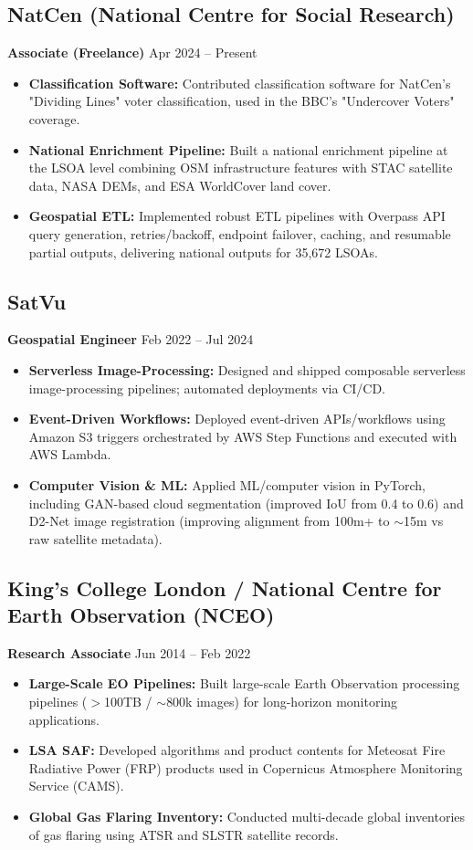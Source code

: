 \documentclass[10pt,a4paper]{article}
\newcommand{\cvitem}[2]{\textbf{#1} \hspace*{\fill} {\small\color{textlight}#2}\\}
\begin{document}
\subsection*{NatCen (National Centre for Social Research)}
\cvitem{Associate (Freelance)}{Apr 2024 -- Present}
\begin{itemize}
    \item \textbf{Classification Software:} Contributed classification software for NatCen's "Dividing Lines" voter classification, used in the BBC's "Undercover Voters" coverage.
    \item \textbf{National Enrichment Pipeline:} Built a national enrichment pipeline at the LSOA level combining OSM infrastructure features with STAC satellite data, NASA DEMs, and ESA WorldCover land cover.
    \item \textbf{Geospatial ETL:} Implemented robust ETL pipelines with Overpass API query generation, retries/backoff, endpoint failover, caching, and resumable partial outputs, delivering national outputs for 35,672 LSOAs.
\end{itemize}

\subsection*{SatVu}
\cvitem{Geospatial Engineer}{Feb 2022 -- Jul 2024}
\begin{itemize}
    \item \textbf{Serverless Image-Processing:} Designed and shipped composable serverless image-processing pipelines; automated deployments via CI/CD.
    \item \textbf{Event-Driven Workflows:} Deployed event-driven APIs/workflows using Amazon S3 triggers orchestrated by AWS Step Functions and executed with AWS Lambda.
    \item \textbf{Computer Vision \& ML:} Applied ML/computer vision in PyTorch, including GAN-based cloud segmentation (improved IoU from 0.4 to 0.6) and D2-Net image registration (improving alignment from 100m+ to $\sim$15m vs raw satellite metadata).
\end{itemize}

\subsection*{King's College London / National Centre for Earth Observation (NCEO)}
\cvitem{Research Associate}{Jun 2014 -- Feb 2022}
\begin{itemize}
    \item \textbf{Large-Scale EO Pipelines:} Built large-scale Earth Observation processing pipelines ($>$100TB / $\sim$800k images) for long-horizon monitoring applications.
    \item \textbf{LSA SAF:} Developed algorithms and product contents for Meteosat Fire Radiative Power (FRP) products used in Copernicus Atmosphere Monitoring Service (CAMS).
    \item \textbf{Global Gas Flaring Inventory:} Conducted multi-decade global inventories of gas flaring using ATSR and SLSTR satellite records.
\end{itemize}
\end{document}
